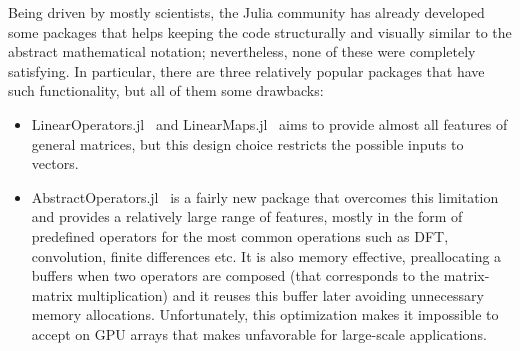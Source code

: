 Being driven by mostly scientists, the Julia community has already developed some packages that helps keeping the code structurally and visually similar to the abstract mathematical notation; nevertheless, none of these were completely satisfying. In particular, there are three relatively popular packages that have such functionality, but all of them some drawbacks:
\begin{itemize}
    \item LinearOperators.jl~\cite{noauthor_juliasmoothoptimizerslinearoperatorsjl_2020} and LinearMaps.jl~\cite{jutho_jutholinearmapsjl_2020} aims to provide almost all features of general matrices, but this design choice restricts the possible inputs to vectors.
    \item AbstractOperators.jl~\cite{noauthor_kul-forbesabstractoperatorsjl_2020} is a fairly new package that overcomes this limitation and provides a relatively large range of features, mostly in the form of predefined operators for the most common operations such as DFT, convolution, finite differences etc. It is also memory effective, preallocating a buffers when two operators are composed (that corresponds to the matrix-matrix multiplication) and it reuses this buffer later avoiding unnecessary memory allocations. Unfortunately, this optimization makes it impossible to accept on GPU arrays that makes unfavorable for large-scale applications.
\end{itemize}

